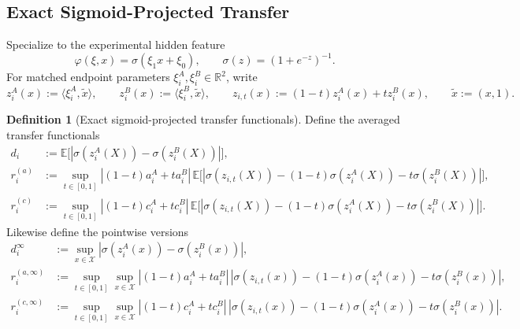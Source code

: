 \documentclass[11pt]{article}
\theoremstyle{definition}
\newtheorem{definition}[theorem]{Definition}
\newcommand{\R}{\mathbb{R}}
\newcommand{\E}{\mathbb{E}}
\newcommand{\abs}[1]{\left\lvert #1 \right\rvert}
\newcommand{\mc}[1]{\mathcal{#1}}
\begin{document}
\subsection{Exact Sigmoid-Projected Transfer}

Specialize to the experimental hidden feature
\[
  \varphi(\xi,x)=\sigma(\xi_1x+\xi_0),
  \qquad
  \sigma(z)=(1+e^{-z})^{-1}.
\]
For matched endpoint parameters $\xi_i^A,\xi_i^B\in\R^2$, write
\[
  z_i^A(x):=\langle \xi_i^A,\tilde x\rangle,
  \qquad
  z_i^B(x):=\langle \xi_i^B,\tilde x\rangle,
  \qquad
  z_{i,t}(x):=(1-t)z_i^A(x)+t z_i^B(x),
  \qquad
  \tilde x:=(x,1).
\]

\begin{definition}[Exact sigmoid-projected transfer functionals]
\label{def:exact-sigmoid-projected}
Define the averaged transfer functionals
\begin{align}
  d_i
  &:=
  \E\big[\abs{\sigma(z_i^A(X))-\sigma(z_i^B(X))}\big],
  \label{eq:exact-di}
  \\
  r_i^{(a)}
  &:=
  \sup_{t\in[0,1]}
  \abs{(1-t)a_i^A+t a_i^B}\,
  \E\big[
    \abs{\sigma(z_{i,t}(X))-(1-t)\sigma(z_i^A(X))-t\sigma(z_i^B(X))}
  \big],
  \label{eq:exact-ra}
  \\
  r_i^{(c)}
  &:=
  \sup_{t\in[0,1]}
  \abs{(1-t)c_i^A+t c_i^B}\,
  \E\big[
    \abs{\sigma(z_{i,t}(X))-(1-t)\sigma(z_i^A(X))-t\sigma(z_i^B(X))}
  \big].
  \label{eq:exact-rc}
\end{align}
Likewise define the pointwise versions
\begin{align}
  d_i^\infty
  &:=
  \sup_{x\in\mc{X}}
  \abs{\sigma(z_i^A(x))-\sigma(z_i^B(x))},
  \label{eq:exact-di-inf}
  \\
  r_i^{(a,\infty)}
  &:=
  \sup_{t\in[0,1]}\sup_{x\in\mc{X}}
  \abs{(1-t)a_i^A+t a_i^B}\,
  \abs{\sigma(z_{i,t}(x))-(1-t)\sigma(z_i^A(x))-t\sigma(z_i^B(x))},
  \label{eq:exact-ra-inf}
  \\
  r_i^{(c,\infty)}
  &:=
  \sup_{t\in[0,1]}\sup_{x\in\mc{X}}
  \abs{(1-t)c_i^A+t c_i^B}\,
  \abs{\sigma(z_{i,t}(x))-(1-t)\sigma(z_i^A(x))-t\sigma(z_i^B(x))}.
  \label{eq:exact-rc-inf}
\end{align}
\end{definition}
\end{document}
